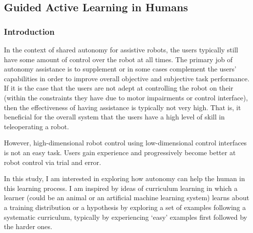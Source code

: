 \documentclass[12pt]{article}
\begin{document}
%
%
%
%
%

\subsection{Guided Active Learning in Humans}
\subsubsection{Introduction}

In the context of shared autonomy for assistive robots, the users typically still have some amount of control over the robot at all times. The primary job of autonomy assistance is to supplement or in some cases complement the users' capabilities in order to improve overall objective and subjective task performance. If it is the case that the users are not adept at controlling the robot on their (within the constraints they have due to motor impairments or control interface), then the effectiveness of having assistance is typically not very high. That is, it beneficial for the overall system that the users have a high level of skill in teleoperating a robot. 

However, high-dimensional robot control using low-dimensional control interfaces is not an easy task. Users gain experience and progressively become better at robot control via trial and error.

In this study, I am interested in exploring how autonomy can help the human in this learning process. I am inspired by ideas of curriculum learning in which a learner (could be an animal or an artificial machine learning system) learns about a training distribution or a hypothesis by exploring a set of examples following a systematic curriculum, typically by experiencing `easy' examples first followed by the harder ones. 
%
%
%
\end{document}
